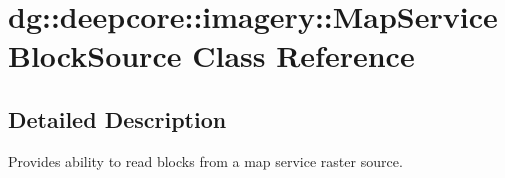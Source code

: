 \hypertarget{classdg_1_1deepcore_1_1imagery_1_1_map_service_block_source}{}\section{dg\+:\+:deepcore\+:\+:imagery\+:\+:Map\+Service\+Block\+Source Class Reference}
\label{classdg_1_1deepcore_1_1imagery_1_1_map_service_block_source}


\subsection{Detailed Description}
Provides ability to read blocks from a map service raster source. 

{\bfseries }\tabulinesep=1mm
